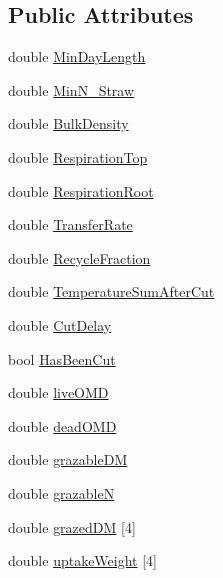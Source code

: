 \subsection*{Public Attributes}
\begin{DoxyCompactItemize}
\item 
double \hyperlink{classcrop_parameters_ryegrass_aef3134f2555e2f6f08d74cff89f837b1}{MinDayLength}
\item 
double \hyperlink{classcrop_parameters_ryegrass_ab59a3756061ad8d3a8e3ec1ca4b5d50e}{MinN\_\-Straw}
\item 
double \hyperlink{classcrop_parameters_ryegrass_ade020c44239741c8565a9458db0ce9c1}{BulkDensity}
\item 
double \hyperlink{classcrop_parameters_ryegrass_aba90f00a4765a645e038e90361bda5f7}{RespirationTop}
\item 
double \hyperlink{classcrop_parameters_ryegrass_a1bec657d9b519708ac2161f4d6658726}{RespirationRoot}
\item 
double \hyperlink{classcrop_parameters_ryegrass_aac0d4f0986b34e113b29335a0a44662d}{TransferRate}
\item 
double \hyperlink{classcrop_parameters_ryegrass_a071c55cef0b8a1da6bc21b0b722778f7}{RecycleFraction}
\item 
double \hyperlink{classcrop_parameters_ryegrass_affe13c8d9d0d04c03f6283202c2de3bd}{TemperatureSumAfterCut}
\item 
double \hyperlink{classcrop_parameters_ryegrass_a3e9e4b0b09e69e483c9c99e22322f194}{CutDelay}
\item 
bool \hyperlink{classcrop_parameters_ryegrass_ad938ef3e7576bfae539971580f2e128f}{HasBeenCut}
\item 
double \hyperlink{classcrop_parameters_ryegrass_a2b8da8d5ca96e03227e5745b58402b48}{liveOMD}
\item 
double \hyperlink{classcrop_parameters_ryegrass_acef899d6bba309f7860e5055d076d7c2}{deadOMD}
\item 
double \hyperlink{classcrop_parameters_ryegrass_a192ed8fd2ef5e69e8f2539aeafa52a77}{grazableDM}
\item 
double \hyperlink{classcrop_parameters_ryegrass_abb3f42d6243945242a751f8eaaf40c8a}{grazableN}
\item 
double \hyperlink{classcrop_parameters_ryegrass_a21090dbb402836fe1d89c5aac6ca2fa2}{grazedDM} \mbox{[}4\mbox{]}
\item 
double \hyperlink{classcrop_parameters_ryegrass_a233c770d2775beda23abccf86b1872cd}{uptakeWeight} \mbox{[}4\mbox{]}
\item 

\end{DoxyCompactItemize}

